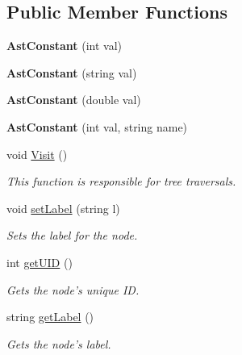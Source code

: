 \subsection*{Public Member Functions}
\begin{DoxyCompactItemize}
\item 
\hypertarget{classAstConstant_ab3d7bb141b6d2650498569fa7742237f}{{\bfseries Ast\-Constant} (int val)}\label{classAstConstant_ab3d7bb141b6d2650498569fa7742237f}

\item 
\hypertarget{classAstConstant_a071adbaa9ea9ad30cde38d68b4182cd9}{{\bfseries Ast\-Constant} (string val)}\label{classAstConstant_a071adbaa9ea9ad30cde38d68b4182cd9}

\item 
\hypertarget{classAstConstant_aef9142c2750c7ad8e83183c7b8ade0e8}{{\bfseries Ast\-Constant} (double val)}\label{classAstConstant_aef9142c2750c7ad8e83183c7b8ade0e8}

\item 
\hypertarget{classAstConstant_a48d0d8e935494c6483cbd7a7a11ab3b9}{{\bfseries Ast\-Constant} (int val, string name)}\label{classAstConstant_a48d0d8e935494c6483cbd7a7a11ab3b9}

\item 
void \hyperlink{classAstConstant_ac13b7246f9d646a5ff00efee4c39bc6b}{Visit} ()
\begin{DoxyCompactList}\small\item\em This function is responsible for tree traversals. \end{DoxyCompactList}\item 
void \hyperlink{classAST_a71d680856e95ff89f55d5311a552eba6}{set\-Label} (string l)
\begin{DoxyCompactList}\small\item\em Sets the label for the node. \end{DoxyCompactList}\item 
int \hyperlink{classAST_ab7a5b1d9f1c2de0d98deb356f724a42c}{get\-U\-I\-D} ()
\begin{DoxyCompactList}\small\item\em Gets the node's unique I\-D. \end{DoxyCompactList}\item 
string \hyperlink{classAST_aee029be902fffc927d16ccb03eb922ad}{get\-Label} ()
\begin{DoxyCompactList}\small\item\em Gets the node's label. \end{DoxyCompactList}\end{DoxyCompactItemize}
